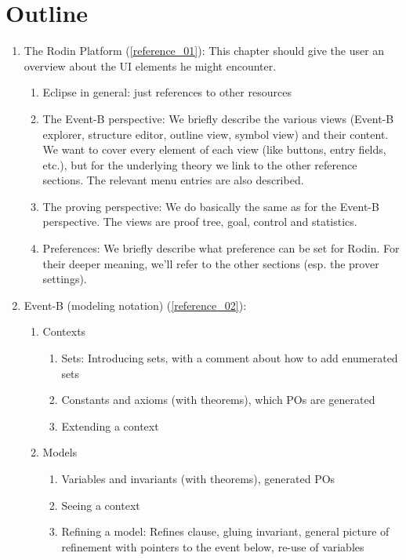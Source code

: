
\section{Outline}

\begin{enumerate}
\item The Rodin Platform (\ref{reference_01}): This chapter should give the user an overview
  about the UI elements he might encounter.
  \begin{enumerate}
  \item Eclipse in general: just references to other resources
  \item The Event-B perspective: We briefly describe the various views
    (Event-B explorer, structure editor, outline view, symbol view)
    and their content.
    We want to cover every element of each view (like buttons, entry fields, etc.),
    but for the underlying theory we link to the other reference sections.
    The relevant menu entries are also described.
  \item The proving perspective: We do basically the same as for the Event-B perspective.
    The views are proof tree, goal, control and statistics.
  \item Preferences: We briefly describe what preference can be set for Rodin.
    For their deeper meaning, we'll refer to the other sections (esp. the prover settings).
  \end{enumerate}
\item Event-B (modeling notation) (\ref{reference_02}):
  \begin{enumerate}
  \item Contexts
    \begin{enumerate}
    \item Sets: Introducing sets, with a comment about how to add enumerated sets
    \item Constants and axioms (with theorems), which POs are generated
    \item Extending a context
    \end{enumerate}
  \item Models
    \begin{enumerate}
    \item Variables and invariants (with theorems), generated POs 
    \item Seeing a context
    \item Refining a model: Refines clause, gluing invariant, general picture of refinement with
      pointers to the event below, re-use of variables

\end{enumerate}
\end{enumerate}
\end{enumerate}
